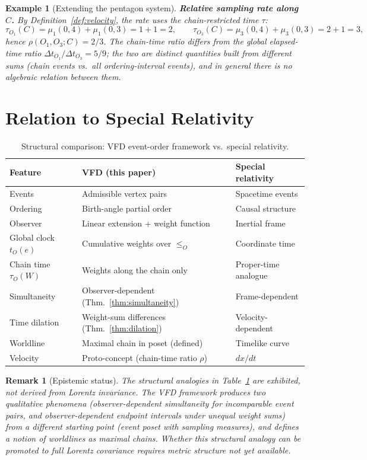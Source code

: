 \documentclass[12pt]{article}
\newtheorem{remark}[theorem]{Remark}
\newtheorem{example}[theorem]{Example}
\begin{document}
\begin{example}[Extending the pentagon system]
\textbf{Relative sampling rate along $C$.} By Definition~\ref{def:velocity}, the rate uses the chain-restricted time $\tau$:
\[
    \tau_{O_1}(C) = \mu_1(0,4) + \mu_1(0,3) = 1 + 1 = 2, \qquad
    \tau_{O_3}(C) = \mu_3(0,4) + \mu_3(0,3) = 2 + 1 = 3,
\]
hence $\rho(O_1, O_3; C) = 2/3$. The chain-time ratio differs from the global elapsed-time ratio $\Delta t_{O_1}/\Delta t_{O_3} = 5/9$; the two are distinct quantities built from different sums (chain events vs.\ all ordering-interval events), and in general there is no algebraic relation between them.
\end{example}

\section{Relation to Special Relativity}\label{sec:SR}

\begin{table}[ht]
\centering
\caption{Structural comparison: VFD event-order framework vs.\ special relativity.}
\label{tab:SR}
\begin{tabular}{@{}lll@{}}
\toprule
Feature & VFD (this paper) & Special relativity \\
\midrule
Events & Admissible vertex pairs & Spacetime events \\
Ordering & Birth-angle partial order & Causal structure \\
Observer & Linear extension + weight function & Inertial frame \\
Global clock $t_O(e)$ & Cumulative weights over $\leq_O$ & Coordinate time \\
Chain time $\tau_O(W)$ & Weights along the chain only & Proper-time analogue \\
Simultaneity & Observer-dependent (Thm.~\ref{thm:simultaneity}) & Frame-dependent \\
Time dilation & Weight-sum differences (Thm.~\ref{thm:dilation}) & Velocity-dependent \\
Worldline & Maximal chain in poset (defined) & Timelike curve \\
Velocity & Proto-concept (chain-time ratio $\rho$) & $dx/dt$ \\
\bottomrule
\end{tabular}
\end{table}

\begin{remark}[Epistemic status]
The structural analogies in Table~\ref{tab:SR} are \textit{exhibited}, not derived from Lorentz invariance. The VFD framework produces two qualitative phenomena (observer-dependent simultaneity for incomparable event pairs, and observer-dependent endpoint intervals under unequal weight sums) from a different starting point (event poset with sampling measures), and defines a notion of worldlines as maximal chains. Whether this structural analogy can be promoted to full Lorentz covariance requires metric structure not yet available.
\end{remark}
\end{document}
